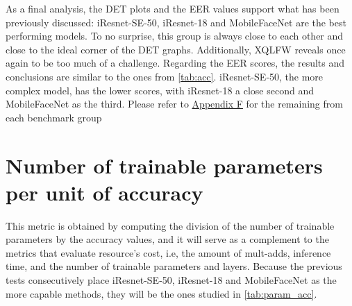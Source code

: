 \documentclass[class=report, crop=false, a4paper, 12pt]{standalone}
\begin{document}
\newpage
\par As a final analysis, the DET plots and the EER values support what has been previously discussed: iResnet-SE-50, iResnet-18 and MobileFaceNet are the best performing models. To no surprise, this group is always close to each other and close to the ideal corner of the DET graphs. Additionally, XQLFW reveals once again to be too much of a challenge. Regarding the EER scores, the results and conclusions are similar to the ones from \autoref{tab:acc}. iResnet-SE-50, the more complex model, has the lower scores, with iResnet-18 a close second and MobileFaceNet as the third. Please refer to \hyperref[appendix:det_curves_appendix]{Appendix F} for the remaining from each benchmark group

\section{Number of trainable parameters per unit of accuracy}

\par This metric is obtained by computing the division of the number of trainable parameters by the accuracy values, and it will serve as a complement to the metrics that evaluate resource's cost, i.e, the amount of mult-adds, inference time, and the number of trainable parameters and layers. Because the previous tests consecutively place iResnet-SE-50, iResnet-18 and MobileFaceNet as the more capable methods, they will be the ones studied in \autoref{tab:param_acc}. 
\end{document}
